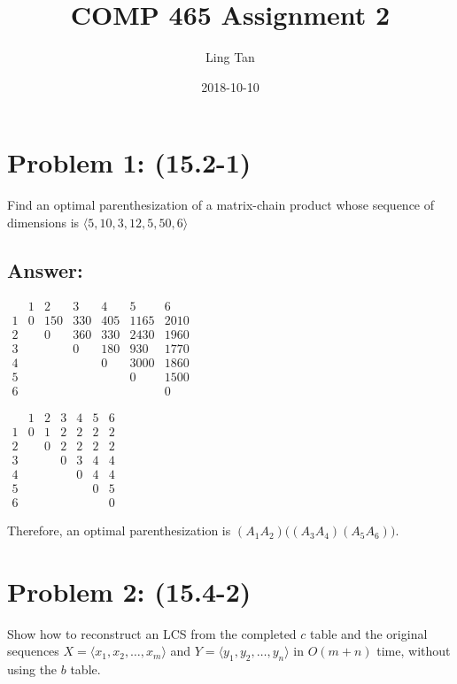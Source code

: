 \documentclass[a4paper]{article}
\title{COMP 465 Assignment 2}
\date{2018-10-10}
\author{Ling Tan}
\begin{document}
\maketitle

\section*{Problem 1: (15.2-1)} Find an optimal parenthesization of a matrix-chain product whose sequence of dimensions is $\langle5, 10, 3, 12, 5, 50, 6\rangle$
\subsection*{Answer:}
\begin{table}[H]
    \centering
    $
    \begin{array}{c|cccccc}
     & 1 & 2 & 3 & 4 & 5 & 6\\
    \hline
     1 & 0 & 150 & 330 & 405 & 1165 & 2010\\
     2 &   & 0 & 360 & 330 & 2430 & 1960\\
     3 &   &   & 0 & 180 & 930 & 1770\\
     4 &   &   &   & 0 & 3000 & 1860\\
     5 &   &   &   &   & 0 & 1500\\
     6 &   &   &   &   &   & 0
    \end{array}
    $
\end{table}
\begin{table}[H]
    \centering
    $
    \begin{array}{c|cccccc}
     & 1 & 2 & 3 & 4 & 5 & 6\\
    \hline
     1 & 0 & 1 & 2 & 2 & 2 & 2\\
     2 &   & 0 & 2 & 2 & 2 & 2\\
     3 &   &   & 0 & 3 & 4 & 4\\
     4 &   &   &   & 0 & 4 & 4\\
     5 &   &   &   &   & 0 & 5\\
     6 &   &   &   &   &   & 0
    \end{array}
    $
\end{table}
Therefore, an optimal parenthesization is $(A_1A_2)\big((A_3A_4)(A_5A_6)\big)$.

\section*{Problem 2: (15.4-2) } Show how to reconstruct an LCS from the completed $c$ table and the original sequences $X = \langle x_1, x_2,\dots, x_m\rangle$ and $Y = \langle y_1, y_2, \dots, y_n\rangle$ in $O(m +n)$ time, without using the $b$ table.
\end{document}
